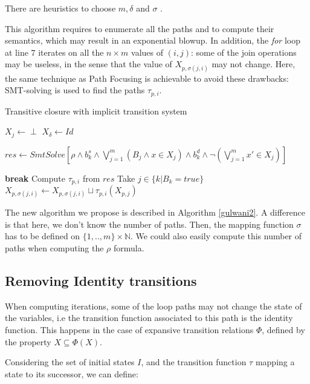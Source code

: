 \documentclass[a4paper,english,titlepage,11pt]{report}
\def\N{\mathbb{N}}
\begin{document}
There are heuristics to choose $m,\delta$ and $\sigma$ \cite[Section
5]{GulwaniZ10}.

This algorithm requires to enumerate all the paths and to compute their
semantics, which may result in an exponential blowup. In addition, the
\emph{for} loop at line $7$ iterates on all the $n \times m$ values of $(i,j)$:
some of the join operations may be useless, in the sense that the value of 
$X_{p,\sigma(j,i)}$ may not change. Here, the same technique as
Path Focusing is achievable to avoid these drawbacks:  SMT-solving is used
to find the paths $\tau_{p,i}$.

\begin{algorithm}[!h]
\caption{Transitive closure with implicit transition system}\label{gulwani2}
\begin{algorithmic}[1] 
	\State $X_{j} \gets \perp$
\EndFor
\State $X_{\delta} \gets Id$

		\State $res \gets SmtSolve\left[\rho \wedge b_k^s \wedge
		\bigvee_{j=1}^m (B_j \wedge x \in X_{j})
		\wedge b_k^d
		\wedge \neg \left(\bigvee_{j=1}^m x' \in X_{j}\right)\right]$

		\State \textbf{break}
	\EndIf
	\State Compute $\tau_{p,i}$ from $res$ 
	\State Take $j \in \{ k | B_k = true\}$ 
	\State $X_{p,\sigma(j,i)} \gets X_{p,\sigma(j,i)} \sqcup
	\tau_{p,i}(X_{p,j})$
\EndWhile
\EndProcedure
\end{algorithmic}
\end{algorithm}

The new algorithm we propose is described in Algorithm \ref{gulwani2}.
A difference is that here, we don't know the number of paths. Then, the mapping
function $\sigma$ has to be defined on $\{1,..,m\} \times \N$. We could also
easily compute this number of paths when computing the $\rho$ formula.


	\subsection{Removing Identity transitions}

	When computing iterations, some of the loop paths may not change the state
	of the variables, i.e the transition function associated to this path is the
	identity function. This happens in the case of expansive transition
	relations $\Phi$, defined by the property $X \subseteq \Phi(X)$.

	Considering the set of initial states $I$, and the transition function 
	$\tau$ mapping a state to its successor, we can define:
\end{document}
